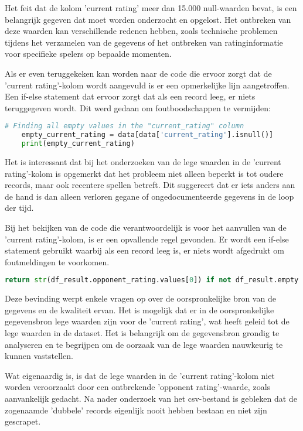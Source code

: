 Het feit dat de kolom 'current rating' meer dan 15.000 null-waarden bevat, is een belangrijk gegeven dat moet worden onderzocht en opgelost. Het ontbreken van deze waarden kan verschillende redenen hebben, zoals technische problemen tijdens het verzamelen van de gegevens of het ontbreken van ratinginformatie voor specifieke spelers op bepaalde momenten.

Als er even teruggekeken kan worden naar de code die ervoor zorgt dat de 'current rating'-kolom wordt aangevuld is er een opmerkelijke lijn aangetroffen. Een if-else statement dat ervoor zorgt dat als een record leeg, er niets teruggegeven wordt. Dit werd gedaan om foutboodschappen te vermijden: 

\begin{lstlisting}[language=Python]
    # Finding all empty values in the "current_rating" column
    empty_current_rating = data[data['current_rating'].isnull()]
    print(empty_current_rating)
\end{lstlisting}

Het is interessant dat bij het onderzoeken van de lege waarden in de 'current rating'-kolom is opgemerkt dat het probleem niet alleen beperkt is tot oudere records, maar ook recentere spellen betreft. Dit suggereert dat er iets anders aan de hand is dan alleen verloren gegane of ongedocumenteerde gegevens in de loop der tijd.

Bij het bekijken van de code die verantwoordelijk is voor het aanvullen van de 'current rating'-kolom, is er een opvallende regel gevonden. Er wordt een if-else statement gebruikt waarbij als een record leeg is, er niets wordt afgedrukt om foutmeldingen te voorkomen.

\begin{lstlisting}[language=Python]
    return str(df_result.opponent_rating.values[0]) if not df_result.empty else ''
\end{lstlisting}

Deze bevinding werpt enkele vragen op over de oorspronkelijke bron van de gegevens en de kwaliteit ervan. Het is mogelijk dat er in de oorspronkelijke gegevensbron lege waarden zijn voor de 'current rating', wat heeft geleid tot de lege waarden in de dataset. Het is belangrijk om de gegevensbron grondig te analyseren en te begrijpen om de oorzaak van de lege waarden nauwkeurig te kunnen vaststellen.

Wat eigenaardig is, is dat de lege waarden in de 'current rating'-kolom niet worden veroorzaakt door een ontbrekende 'opponent rating'-waarde, zoals aanvankelijk gedacht. Na nader onderzoek van het csv-bestand is gebleken dat de zogenaamde 'dubbele' records eigenlijk nooit hebben bestaan en niet zijn gescrapet.

